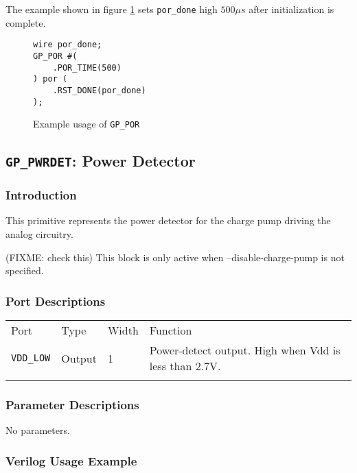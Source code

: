 \documentclass[11pt]{article}
\newcommand{\tokenstyle}[1]{\texttt{#1}}
\newcommand{\wirestyle}[1]{\texttt{#1}}
\newcommand{\whenstyle}[1]{{\fontseries{sb}\selectfont#1}}
\newcommand{\thinhline}{\Xhline{1\arrayrulewidth}}
\newcommand{\thickhline}{\Xhline{2.5\arrayrulewidth}}
\begin{document}
The example shown in figure \ref{gp-por-example} sets \wirestyle{por\_done} high $500 \mu s$ after initialization is complete.

\begin{figure}[h]
\begin{lstlisting}
wire por_done;
GP_POR #(
	.POR_TIME(500)
) por (
	.RST_DONE(por_done)
);
\end{lstlisting}
\caption{Example usage of \tokenstyle{GP\_POR}}
\label{gp-por-example}
\end{figure}


\pagebreak
\clearpage
\subsection{\tokenstyle{GP\_PWRDET}: Power Detector}
\label{gp-pwrdet}

\subsubsection{Introduction}
This primitive represents the power detector for the charge pump driving the analog circuitry.

(FIXME: check this) This block is only active when --disable-charge-pump is not specified.

\subsubsection{Port Descriptions}

\begin{tabularx}{\textwidth}{lllX}
\thinhline
\whenstyle{Port} & \whenstyle{Type} & \whenstyle{Width} & \whenstyle{Function} \\
\thickhline
\tokenstyle{VDD\_LOW} & Output & 1 & Power-detect output. High when Vdd is less than 2.7V.\\
\thinhline
\end{tabularx}

\subsubsection{Parameter Descriptions}

No parameters.

\subsubsection{Verilog Usage Example}
\end{document}
